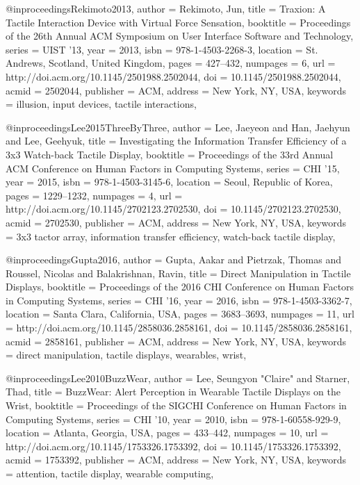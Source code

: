 @inproceedings{Rekimoto2013,
 author = {Rekimoto, Jun},
 title = {{Traxion: A Tactile Interaction Device with Virtual Force Sensation}},
 booktitle = {Proceedings of the 26th Annual ACM Symposium on User Interface Software and Technology},
 series = {UIST '13},
 year = {2013},
 isbn = {978-1-4503-2268-3},
 location = {St. Andrews, Scotland, United Kingdom},
 pages = {427--432},
 numpages = {6},
 url = {http://doi.acm.org/10.1145/2501988.2502044},
 doi = {10.1145/2501988.2502044},
 acmid = {2502044},
 publisher = {ACM},
 address = {New York, NY, USA},
 keywords = {illusion, input devices, tactile interactions},
} 

@inproceedings{Lee2015ThreeByThree,
 author = {Lee, Jaeyeon and Han, Jaehyun and Lee, Geehyuk},
 title = {{Investigating the Information Transfer Efficiency of a 3x3 Watch-back Tactile Display}},
 booktitle = {Proceedings of the 33rd Annual ACM Conference on Human Factors in Computing Systems},
 series = {CHI '15},
 year = {2015},
 isbn = {978-1-4503-3145-6},
 location = {Seoul, Republic of Korea},
 pages = {1229--1232},
 numpages = {4},
 url = {http://doi.acm.org/10.1145/2702123.2702530},
 doi = {10.1145/2702123.2702530},
 acmid = {2702530},
 publisher = {ACM},
 address = {New York, NY, USA},
 keywords = {3x3 tactor array, information transfer efficiency, watch-back tactile display},
} 

@inproceedings{Gupta2016,
 author = {Gupta, Aakar and Pietrzak, Thomas and Roussel, Nicolas and Balakrishnan, Ravin},
 title = {{Direct Manipulation in Tactile Displays}},
 booktitle = {Proceedings of the 2016 CHI Conference on Human Factors in Computing Systems},
 series = {CHI '16},
 year = {2016},
 isbn = {978-1-4503-3362-7},
 location = {Santa Clara, California, USA},
 pages = {3683--3693},
 numpages = {11},
 url = {http://doi.acm.org/10.1145/2858036.2858161},
 doi = {10.1145/2858036.2858161},
 acmid = {2858161},
 publisher = {ACM},
 address = {New York, NY, USA},
 keywords = {direct manipulation, tactile displays, wearables, wrist},
} 

@inproceedings{Lee2010BuzzWear,
 author = {Lee, Seungyon "Claire" and Starner, Thad},
 title = {{BuzzWear: Alert Perception in Wearable Tactile Displays on the Wrist}},
 booktitle = {Proceedings of the SIGCHI Conference on Human Factors in Computing Systems},
 series = {CHI '10},
 year = {2010},
 isbn = {978-1-60558-929-9},
 location = {Atlanta, Georgia, USA},
 pages = {433--442},
 numpages = {10},
 url = {http://doi.acm.org/10.1145/1753326.1753392},
 doi = {10.1145/1753326.1753392},
 acmid = {1753392},
 publisher = {ACM},
 address = {New York, NY, USA},
 keywords = {attention, tactile display, wearable computing},
} 

